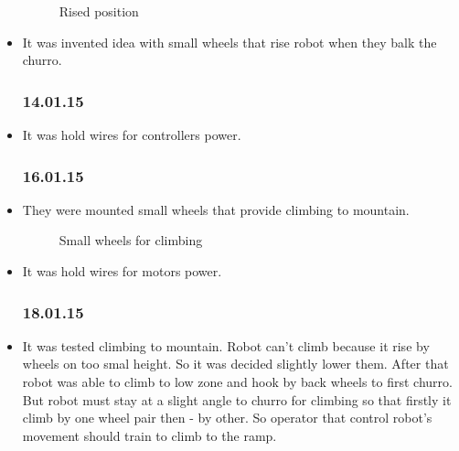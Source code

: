\begin{itemize}
\begin{figure}[H]
\begin{minipage}[h]{1\linewidth}
				\caption{Rised position}
			\end{minipage}
		\end{figure}
		
		\item It was invented idea with small wheels that rise robot when they balk the churro.
	\subsubsection{14.01.15}
		\item It was hold wires for controllers power.
	\subsubsection{16.01.15}
		\item They were mounted small wheels that provide climbing to mountain.
		\begin{figure}[H]
			\begin{minipage}[h]{1\linewidth}
				\caption{Small wheels for climbing}
			\end{minipage}
		\end{figure}
		
		\item It was hold wires for motors power.
	\subsubsection{18.01.15}
		\item It was tested climbing to mountain. Robot can't climb because it rise by wheels on too smal height. So it was decided slightly lower them. After that robot was able to climb to low zone and hook by back wheels to first churro. But robot must stay at a slight angle to churro for climbing so that firstly it climb by one wheel pair then - by other. So operator that control robot's movement should train to climb to the ramp.
		

\end{itemize}
